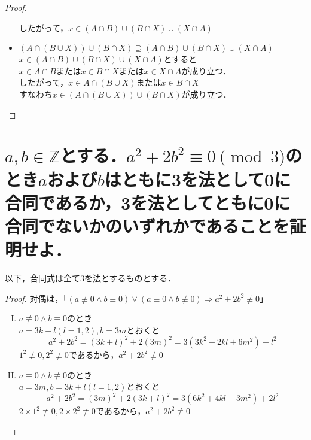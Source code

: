 \documentclass[a4paper,12pt]{ltjsarticle}
\newcommand{\Z}{\mathbb{Z}}
\begin{document}
\begin{proof}
\begin{itemize}
            したがって，$x \in (A \cap B) \cup (B \cap X) \cup (X \cap A)$
        \item $(A \cap (B \cup X)) \cup (B \cap X) \supseteq (A \cap B) \cup (B \cap X) \cup (X \cap A)$ \\
            $x \in (A \cap B) \cup (B \cap X) \cup (X \cap A)$とすると \\
            $x \in A \cap B$または$x \in B \cap X$または$x \in X \cap A$が成り立つ． \\
            したがって，$x \in A \cap (B \cup X)$または$x \in B \cap X$ \\
            すなわち$x \in (A \cap (B \cup X)) \cup (B \cap X)$が成り立つ．
    \end{itemize}
\end{proof}

\section{$a,b \in \Z$とする．$a^2 + 2b^2 \equiv 0 \pmod 3$のとき$a$および$b$はともに3を法として0に合同であるか，3を法としてともに0に合同でないかのいずれかであることを証明せよ．}
以下，合同式は全て3を法とするものとする．
\begin{proof}
    対偶は，「$(a \not\equiv 0 \land b \equiv 0) \lor (a \equiv 0 \land b \not\equiv 0) \Rightarrow a^2 + 2b^2 \not\equiv 0$」
    \begin{enumerate}[(I)]
        \item $a \not\equiv 0 \land b \equiv 0$のとき \\
            $a = 3k + l(l = 1,2), b = 3m$とおくと
            \begin{equation*}
                a^2 + 2b^2 = (3k + l)^2 + 2(3m)^2 = 3(3k^2 + 2kl + 6m^2) + l^2
            \end{equation*}
            $1^2 \not\equiv 0 , 2^2 \not\equiv 0$であるから，$a^2 + 2b^2 \not\equiv 0$
        \item $a \equiv 0 \land b \not\equiv 0$のとき \\
            $a = 3m, b = 3k + l(l = 1,2)$とおくと
            \begin{equation*}
                a^2 + 2b^2 = (3m)^2 + 2(3k + l)^2 = 3(6k^2 + 4kl + 3m^2) + 2l^2
            \end{equation*}
            $2 \times 1^2 \not\equiv 0 , 2 \times 2^2 \not\equiv 0$であるから，$a^2 + 2b^2 \not\equiv 0$
    \end{enumerate}
\end{proof}
\end{document}

